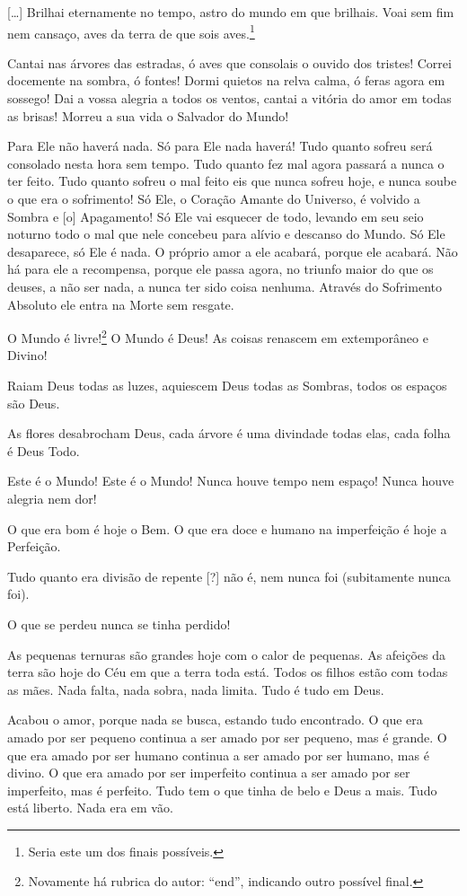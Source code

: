 \bigskip

[\ldots{}] Brilhai eternamente no tempo, astro do mundo em que brilhais. Voai sem
fim nem cansaço, aves da terra de que sois aves.\footnote{Seria este
um dos finais possíveis.}

\repl{[Coro]} Cantai nas árvores das estradas, ó aves que consolais o
ouvido dos tristes! Correi
docemente na sombra, ó fontes! Dormi quietos na relva calma, ó feras
agora em sossego! Dai a vossa alegria a todos os ventos, cantai a
vitória do amor em todas as brisas! Morreu a sua vida o Salvador do
Mundo!  

Para Ele não haverá nada. Só para Ele nada haverá! Tudo quanto sofreu
será consolado nesta hora sem tempo. Tudo quanto fez mal agora
passará a nunca o ter feito. Tudo quanto sofreu o mal feito eis que
nunca sofreu hoje, e nunca soube o que era o sofrimento! Só Ele, o
Coração Amante do Universo, é volvido a Sombra e [o] Apagamento! Só
Ele vai esquecer de todo, levando em seu seio noturno todo o mal que
nele concebeu para alívio e descanso do Mundo. Só Ele desaparece, só
Ele é nada. O próprio amor a ele acabará, porque ele acabará. Não há
para ele a recompensa, porque ele passa agora, no triunfo maior do
que os deuses, a não ser nada, a nunca ter sido coisa nenhuma.
Através do Sofrimento Absoluto ele entra na Morte sem resgate.

O Mundo é livre!\footnote{ Novamente há rubrica do autor: “end”,
indicando outro possível final.} O Mundo é Deus! As coisas renascem
em extemporâneo e Divino!

Raiam Deus todas as luzes, aquiescem Deus todas as Sombras, todos os
espaços são Deus.

As flores desabrocham Deus, cada árvore é uma divindade todas elas,
cada folha é Deus Todo.

Este é o Mundo! Este é o Mundo! Nunca houve tempo nem espaço! Nunca
houve alegria nem dor!

O que era bom é hoje o Bem. O que era doce e humano na imperfeição é
hoje a Perfeição.

Tudo quanto era divisão de repente [?] não é, nem nunca foi
(subitamente nunca foi).

O que se perdeu nunca se tinha perdido!

As pequenas ternuras são grandes hoje com o calor de pequenas. As
afeições da terra são hoje do Céu em que a terra toda está. Todos os
filhos estão com todas as mães. Nada falta, nada sobra, nada limita.
Tudo é tudo em Deus.

 Acabou o amor,
porque nada se busca, estando tudo encontrado. O que era amado por
ser pequeno continua a ser amado por ser pequeno, mas é grande. O que
era amado por ser humano continua a ser amado por ser humano, mas é
divino. O que era amado por ser imperfeito continua a ser amado por
ser imperfeito, mas é perfeito. Tudo tem o que tinha de belo e Deus a
mais. Tudo está liberto. Nada era em vão.


